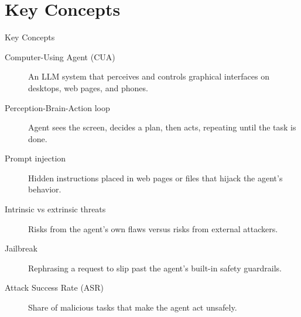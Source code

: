 \documentclass[10pt]{beamer}
\begin{document}
\section{Key Concepts}
\begin{frame}[allowframebreaks]{Key Concepts}
  \begin{description}
    \item[Computer-Using Agent (CUA)] An LLM system that perceives and controls graphical interfaces on desktops, web pages, and phones.
    \item[Perception-Brain-Action loop] Agent sees the screen, decides a plan, then acts, repeating until the task is done.
    \item[Prompt injection] Hidden instructions placed in web pages or files that hijack the agent's behavior.
    \item[Intrinsic vs extrinsic threats] Risks from the agent's own flaws versus risks from external attackers.
    \item[Jailbreak] Rephrasing a request to slip past the agent's built-in safety guardrails.
    \item[Attack Success Rate (ASR)] Share of malicious tasks that make the agent act unsafely.
  \end{description}
\end{frame}
\end{document}
